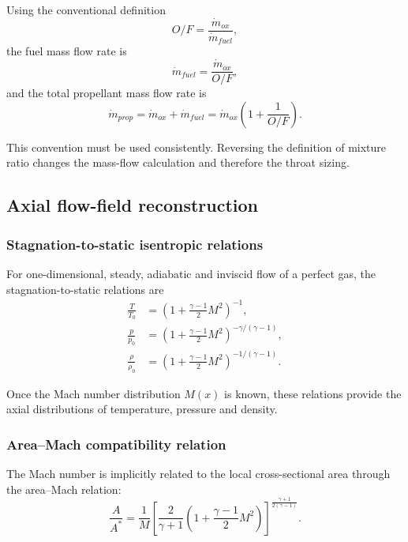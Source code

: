 \documentclass[11pt,a4paper]{article}
\begin{document}
Using the conventional definition
\begin{equation}
O/F=\frac{\dot{m}_{ox}}{\dot{m}_{fuel}},
\end{equation}
the fuel mass flow rate is
\begin{equation}
\dot{m}_{fuel}=\frac{\dot{m}_{ox}}{O/F},
\end{equation}
and the total propellant mass flow rate is
\begin{equation}
\dot{m}_{prop}=\dot{m}_{ox}+\dot{m}_{fuel}
=\dot{m}_{ox}\left(1+\frac{1}{O/F}\right).
\label{eq:mdot_total}
\end{equation}

This convention must be used consistently. Reversing the definition of mixture ratio changes the mass-flow calculation and therefore the throat sizing.

% 

\subsection{Axial flow-field reconstruction}

\subsubsection{Stagnation-to-static isentropic relations}

For one-dimensional, steady, adiabatic and inviscid flow of a perfect gas, the stagnation-to-static relations are
\begin{align}
\frac{T}{T_0} &= \left(1+\frac{\gamma-1}{2}M^2\right)^{-1},
\label{eq:T_T0}\\
\frac{p}{p_0} &= \left(1+\frac{\gamma-1}{2}M^2\right)^{-\gamma/(\gamma-1)},
\label{eq:p_p0}\\
\frac{\rho}{\rho_0} &= \left(1+\frac{\gamma-1}{2}M^2\right)^{-1/(\gamma-1)}.
\label{eq:rho_rho0}
\end{align}

Once the Mach number distribution $M(x)$ is known, these relations provide the axial distributions of temperature, pressure and density.

\subsubsection{Area--Mach compatibility relation}

The Mach number is implicitly related to the local cross-sectional area through the area--Mach relation:
\begin{equation}
\frac{A}{A^*}=\frac{1}{M}
\left[
\frac{2}{\gamma+1}
\left(1+\frac{\gamma-1}{2}M^2\right)
\right]^{\frac{\gamma+1}{2(\gamma-1)}} .
\label{eq:area_mach}
\end{equation}
\end{document}
